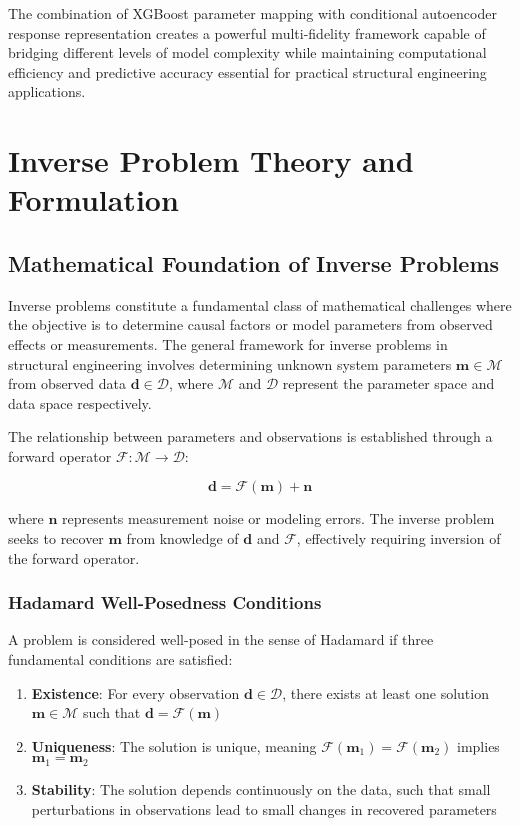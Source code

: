 \documentclass[12pt,a4paper]{report}
\begin{document}
The combination of XGBoost parameter mapping with conditional autoencoder response representation creates a powerful multi-fidelity framework capable of bridging different levels of model complexity while maintaining computational efficiency and predictive accuracy essential for practical structural engineering applications.

\section{Inverse Problem Theory and Formulation}
\label{sec:inverse_theory}

\subsection{Mathematical Foundation of Inverse Problems}

Inverse problems constitute a fundamental class of mathematical challenges where the objective is to determine causal factors or model parameters from observed effects or measurements. The general framework for inverse problems in structural engineering involves determining unknown system parameters $\mathbf{m} \in \mathcal{M}$ from observed data $\mathbf{d} \in \mathcal{D}$, where $\mathcal{M}$ and $\mathcal{D}$ represent the parameter space and data space respectively.

The relationship between parameters and observations is established through a forward operator $\mathcal{F}: \mathcal{M} \rightarrow \mathcal{D}$:

\begin{equation}
\mathbf{d} = \mathcal{F}(\mathbf{m}) + \mathbf{n}
\end{equation}

where $\mathbf{n}$ represents measurement noise or modeling errors. The inverse problem seeks to recover $\mathbf{m}$ from knowledge of $\mathbf{d}$ and $\mathcal{F}$, effectively requiring inversion of the forward operator.

\subsubsection{Hadamard Well-Posedness Conditions}

A problem is considered well-posed in the sense of Hadamard if three fundamental conditions are satisfied:

\begin{enumerate}
\item \textbf{Existence}: For every observation $\mathbf{d} \in \mathcal{D}$, there exists at least one solution $\mathbf{m} \in \mathcal{M}$ such that $\mathbf{d} = \mathcal{F}(\mathbf{m})$
\item \textbf{Uniqueness}: The solution is unique, meaning $\mathcal{F}(\mathbf{m}_1) = \mathcal{F}(\mathbf{m}_2)$ implies $\mathbf{m}_1 = \mathbf{m}_2$
\item \textbf{Stability}: The solution depends continuously on the data, such that small perturbations in observations lead to small changes in recovered parameters
\end{enumerate}
\end{document}
